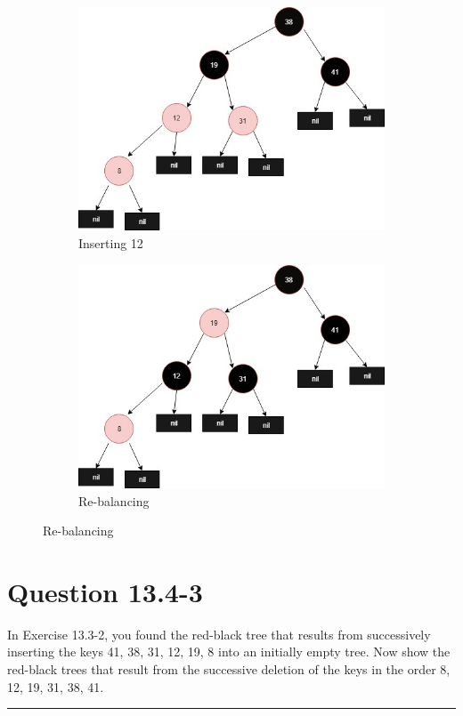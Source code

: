 \documentclass[20pt]{article} %
\begin{document}
\begin{figure}
   	\begin{subfigure}[p]{0.4\linewidth}
    	\includegraphics[width=\linewidth]{6-1.jpg}
     	\caption{Inserting 12}
   	\end{subfigure}
  	\begin{subfigure}[p]{0.4\linewidth}
    	\includegraphics[width=\linewidth]{6-2.jpg}
    	\caption{Re-balancing}
  	\end{subfigure}

\end{figure}

\newpage
\newpage
\newpage
\newpage
\section{Question 13.4-3}
In Exercise 13.3-2, you found the red-black tree that results from successively inserting the keys 41, 38, 31, 12, 19, 8 into an initially empty tree. Now show the red-black trees that result from the successive deletion of the keys in the order 8, 12, 19, 31, 38, 41. \\
\noindent\rule{2cm}{0.4pt} \\
\end{document}
